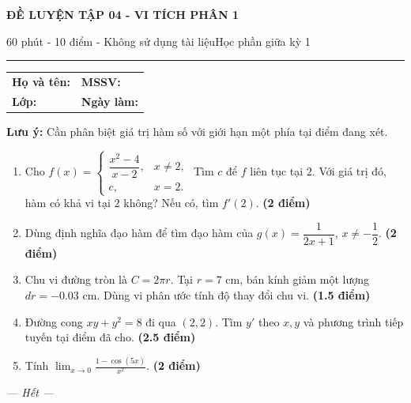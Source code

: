 \documentclass[11pt,a4paper]{article}
\newcommand{\examtitle}[4]{\begin{center}{\Large\bfseries\color{hcmusblue}#1}\par\vspace{3pt}{\large\bfseries #2}\par\vspace{3pt}\small #3\quad\textbullet\quad #4\end{center}\vspace{5pt}\hrule\vspace{8pt}}
\newcommand{\studentline}{\begin{tabularx}{\textwidth}{X X}\textbf{Họ và tên:} \hrulefill & \textbf{MSSV:} \hrulefill\\[7pt]\textbf{Lớp:} \hrulefill & \textbf{Ngày làm:} \hrulefill\end{tabularx}\vspace{8pt}}
\newcommand{\points}[1]{\hfill\textbf{(#1 điểm)}}
\begin{document}
\examtitle{ĐỀ LUYỆN TẬP 04 - VI TÍCH PHÂN 1}{VI TÍCH PHÂN 1 - HCMUS (bộ luyện tập)}{60 phút - 10 điểm - Không sử dụng tài liệu}{Học phần giữa kỳ 1}

\studentline
\begin{notebox}\textbf{Lưu ý:} Cần phân biệt giá trị hàm số với giới hạn một phía tại điểm đang xét.\end{notebox}
\begin{enumerate}
\item Cho $f(x)=\begin{cases}\dfrac{x^2-4}{x-2},&x\ne2,\\c,&x=2.\end{cases}$ Tìm $c$ để $f$ liên tục tại $2$. Với giá trị đó, hàm có khả vi tại $2$ không? Nếu có, tìm $f'(2)$. \points{2}
\item Dùng định nghĩa đạo hàm để tìm đạo hàm của $g(x)=\dfrac{1}{2x+1}$, $x\ne-\dfrac12$. \points{2}
\item Chu vi đường tròn là $C=2\pi r$. Tại $r=7$ cm, bán kính giảm một lượng $dr=-0.03$ cm. Dùng vi phân ước tính độ thay đổi chu vi. \points{1.5}
\item Đường cong $xy+y^2=8$ đi qua $(2,2)$. Tìm $y'$ theo $x,y$ và phương trình tiếp tuyến tại điểm đã cho. \points{2.5}
\item Tính $\displaystyle\lim_{x\to0}\frac{1-\cos(5x)}{x^2}$. \points{2}
\end{enumerate}
\vfill\begin{center}\textit{--- Hết ---}\end{center}
\end{document}
